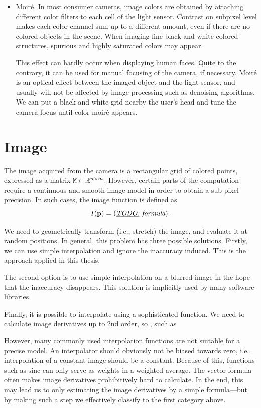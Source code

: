 \begin{itemize}
\item
Moiré.
In most consumer cameras, image colors are obtained by attaching different color filters to each cell of the light sensor.
Contrast on subpixel level makes each color channel sum up to a different amount, even if there are no colored objects in the scene.
When imaging fine black-and-white colored structures, spurious and highly saturated colors may appear.

This effect can hardly occur when displaying human faces.
Quite to the contrary, it can be used for manual focusing of the camera, if necessary.
Moiré is an optical effect between the imaged object and the light sensor, and usually will not be affected by image processing such as denoising algorithms.
We can put a black and white grid nearby the user's head and tune the camera focus until color moiré appears.

\end{itemize}

\section{Image}
\label{s.imagemodel}

The image acquired from the camera is a rectangular grid of colored points, expressed as a matrix $\mathtt{M} \in \mathbb{R}^{n\times m}$.
However, certain parts of the computation require a continuous and smooth image model in order to obtain a sub-pixel precision.
In such cases, the image function is defined as
$$I(\mathbf{p}) = (\textit{\underline{TODO:} formula}).$$

We need to geometrically transform (i.e., stretch) the image, and evaluate it at random positions.
In general, this problem has three possible solutions.
Firstly, we can use simple interpolation and ignore the inaccuracy induced.
This is the approach applied in this thesis.

The second option is to use simple interpolation on a blurred image in the hope that the inaccuracy disappears.
This solution is implicitly used by many software libraries.

Finally, it is possible to interpolate using a sophisticated function.
We need to calculate image derivatives up to 2nd order, so , such as

However, many commonly used interpolation functions are not suitable for a precise model.
An interpolator should obviously not be biased towards zero, i.e., interpolation of a constant image should be a constant.
Because of this, functions such as $\mathrm{sinc}$ can only serve as weights in a weighted average.
The vector formula  often makes image derivatives prohibitively hard to calculate.
In the end, this may lead us to only estimating the image derivatives by a simple formula---but by making such a step we effectively classify to the first category above.

